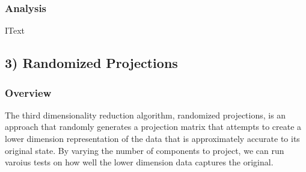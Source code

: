 \documentclass[h]{article}
\begin{document}
\subsubsection*{Analysis}
IText

\subsection*{3) Randomized Projections}  
\subsubsection*{Overview}
The third dimensionality reduction algorithm, randomized projections, is an 
approach that randomly generates a projection matrix that attempts to create a 
lower dimension representation of the data that is approximately accurate to 
its original state.  By varying the number of components to project, we can run 
varoius tests on how well the lower dimension data captures the original.
\end{document}
